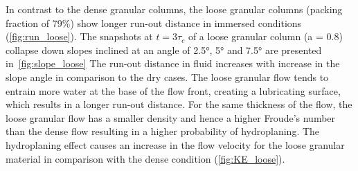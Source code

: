 In contrast to the dense granular columns, the loose granular columns (packing 
fraction of 79\%) show longer run-out distance in immersed conditions 
(\cref{fig:run_loose}). The snapshots at $t = 3\tau_c$ of a loose granular 
column (a = 0.8) collapse down slopes inclined at an angle of 2.5\si{\degree}, 
5\si{\degree} and 7.5\si{\degree} are presented in~\cref{fig:slope_loose} The 
run-out distance in fluid increases with increase in the slope angle in 
comparison to the dry cases. The loose granular flow tends to entrain more 
water at the base of the flow front, creating a lubricating surface, which 
results in a longer run-out distance. For the same thickness of the flow, 
the loose granular flow has a smaller density and hence a higher Froude's 
number than the dense flow resulting in a higher probability of hydroplaning. 
The hydroplaning effect causes an increase in the flow velocity for the loose 
granular material in comparison with the dense condition 
(\cref{fig:KE_loose}).

